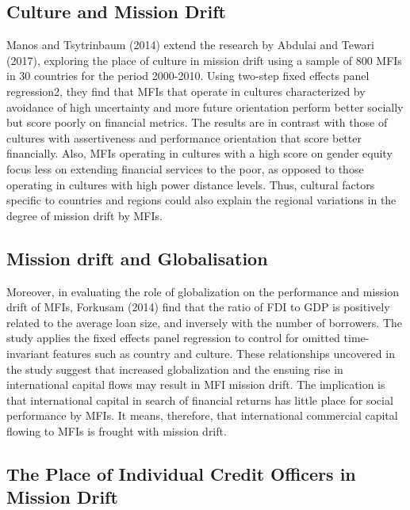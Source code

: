\documentclass[a4paper, nobind]{templates/ociamthesis}
\begin{document}
\hypertarget{culture-and-mission-drift}{%
\subsection{Culture and Mission Drift}\label{culture-and-mission-drift}}

\noindent Manos and Tsytrinbaum (2014) extend the research by Abdulai and Tewari (2017), exploring the place of culture in mission drift using a sample of 800 MFIs in 30 countries for the period 2000-2010. Using two-step fixed effects panel regression2, they find that MFIs that operate in cultures characterized by avoidance of high uncertainty and more future orientation perform better socially but score poorly on financial metrics. The results are in contrast with those of cultures with assertiveness and performance orientation that score better financially. Also, MFIs operating in cultures with a high score on gender equity focus less on extending financial services to the poor, as opposed to those operating in cultures with high power distance levels. Thus, cultural factors specific to countries and regions could also explain the regional variations in the degree of mission drift by MFIs.

\hypertarget{mission-drift-and-globalisation}{%
\subsection{Mission drift and Globalisation}\label{mission-drift-and-globalisation}}

\noindent Moreover, in evaluating the role of globalization on the performance and mission drift of MFIs, Forkusam (2014) find that the ratio of FDI to GDP is positively related to the average loan size, and inversely with the number of borrowers. The study applies the fixed effects panel regression to control for omitted time-invariant features such as country and culture. These relationships uncovered in the study suggest that increased globalization and the ensuing rise in international capital flows may result in MFI mission drift. The implication is that international capital in search of financial returns has little place for social performance by MFIs. It means, therefore, that international commercial capital flowing to MFIs is frought with mission drift.

\hypertarget{the-place-of-individual-credit-officers-in-mission-drift}{%
\subsection{The Place of Individual Credit Officers in Mission Drift}\label{the-place-of-individual-credit-officers-in-mission-drift}}
\end{document}
